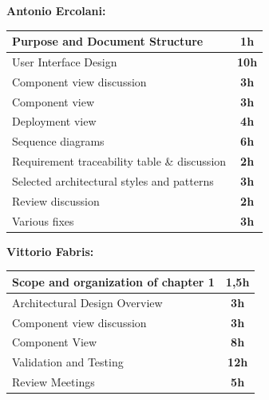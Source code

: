 \documentclass[]{article}
\begin{document}
			\medskip
			\textbf{\large Antonio Ercolani:} \\ \newline
			\begin{tabular}{|l|c|}
				\hline
				\begin{minipage}[t]{10cm}
				Purpose and Document Structure
				\end{minipage} 
				& \textbf{1h} \\ \hline
				\rowcolor[HTML]{DCDCDC} 
				User Interface Design & \textbf{10h} \\ \hline
				Component view discussion & \textbf{3h} \\ \hline
				\rowcolor[HTML]{DCDCDC} 
				Component view & \textbf{3h} \\ \hline
				Deployment view & \textbf{4h} \\ \hline
				\rowcolor[HTML]{DCDCDC} 
				Sequence diagrams & \textbf{6h} \\ \hline
				Requirement traceability table \& discussion & \textbf{2h} \\ \hline
				\rowcolor[HTML]{DCDCDC} 
				Selected architectural styles and patterns  & \textbf{3h} \\ \hline
				Review discussion  & \textbf{2h} \\ \hline
				\rowcolor[HTML]{DCDCDC} 
				Various fixes  & \textbf{3h} \\ \hline
				
			\end{tabular}
			\newline
			\newline
			
			\medskip
			\textbf{\large Vittorio Fabris:} \\ \newline
			\begin{tabular}{|l|c|}
				\hline
				\begin{minipage}[t]{10cm}
					Scope and organization of chapter 1
				\end{minipage} 
				& \textbf{1,5h} \\ \hline
				\rowcolor[HTML]{DCDCDC} 
				 Architectural Design Overview & \textbf{3h} \\ \hline
				 Component view discussion & \textbf{3h} \\ \hline
				\rowcolor[HTML]{DCDCDC} 
				Component View & \textbf{8h} \\ \hline
				Validation and Testing & \textbf{12h} \\ \hline
				\rowcolor[HTML]{DCDCDC} 
				Review Meetings & \textbf{5h} \\ \hline
			\end{tabular}
		\newline \newline
		
\end{document}
